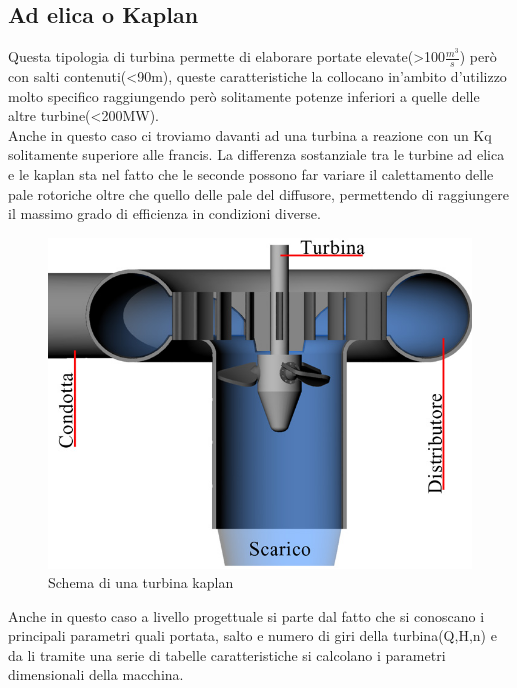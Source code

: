\subsection{Ad elica o Kaplan}
Questa tipologia di turbina permette di elaborare portate elevate(>100\large$\frac{m^3}{s}$) però con salti contenuti(<90m), queste caratteristiche la collocano in'ambito d'utilizzo molto specifico raggiungendo però solitamente potenze inferiori a quelle delle altre turbine(<200MW).\\
Anche in questo caso ci troviamo davanti ad una turbina a reazione con un Kq solitamente superiore alle francis.
La differenza sostanziale tra le turbine ad elica e le kaplan sta nel fatto che le seconde possono far variare il calettamento delle pale rotoriche oltre che quello delle pale del diffusore, permettendo di raggiungere il massimo grado di efficienza in condizioni diverse.
\begin{figure}[H]
    \centering
    \includegraphics[height=0.4\textwidth]{res/cap 3/kaplan}
    \caption{Schema di una turbina kaplan}
\end{figure}\noindent
Anche in questo caso a livello progettuale si parte dal fatto che si conoscano i principali parametri quali portata, salto e numero di giri della turbina(Q,H,n) e da li tramite una serie di tabelle caratteristiche si calcolano i parametri dimensionali della macchina.